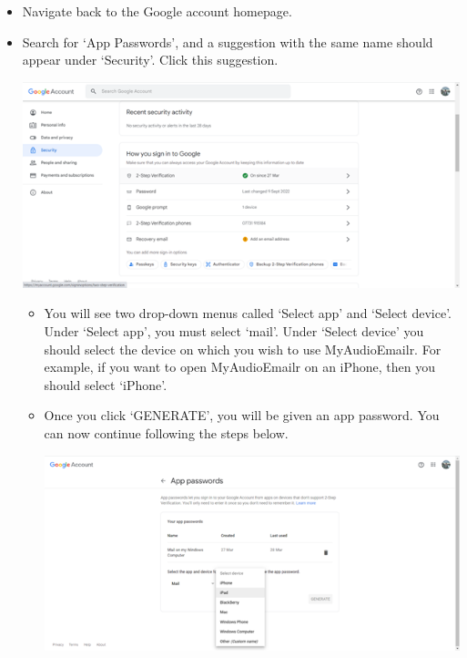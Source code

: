 \documentclass{article}
\begin{document}
\begin{enumerate}
\begin{itemize}
        \item Navigate back to the Google account homepage.
        \item Search for ‘App Passwords’, and a suggestion with the same name should appear under ‘Security’. Click this suggestion.
        \begin{center}
            \includegraphics[]{google verfication.png}
        \end{center}
        \begin{itemize}
            \item You will see two drop-down menus called ‘Select app’ and ‘Select device’. Under ‘Select app’, you must select ‘mail’. Under ‘Select device’ you should select the device on which you wish to use MyAudioEmailr. For example, if you want to open MyAudioEmailr on an iPhone, then you should select ‘iPhone’.
            \item Once you click ‘GENERATE’, you will be given an app password. You can now continue following the steps below.
            \begin{center}
                \includegraphics[]{app password.png}

\end{center}
\end{itemize}
\end{itemize}
\end{enumerate}
\end{document}

